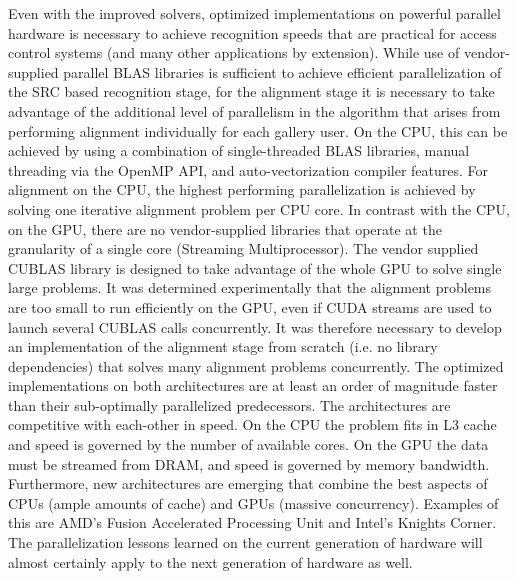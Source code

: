 Even with the improved solvers, optimized implementations on powerful parallel
hardware is necessary to achieve recognition speeds that are practical for
access control systems (and many other applications by extension).  While use
of vendor-supplied parallel BLAS libraries is sufficient to achieve efficient
parallelization of the SRC based recognition stage, for the alignment stage it
is necessary to take advantage of the additional level of parallelism in the
algorithm that arises from performing alignment individually for each gallery
user.  On the CPU, this can be achieved by using a combination of
single-threaded BLAS libraries, manual threading via the OpenMP API, and
auto-vectorization compiler features.  For alignment on the CPU, the highest
performing parallelization is achieved by solving one iterative alignment
problem per CPU core.  In contrast with the CPU, on the GPU, there are no
vendor-supplied libraries that operate at the granularity of a single core
(Streaming Multiprocessor).  The vendor supplied CUBLAS library is designed to
take advantage of the whole GPU to solve single large problems.  It was
determined experimentally that the alignment problems are too small to run
efficiently on the GPU, even if CUDA streams are used to launch several CUBLAS
calls concurrently.  It was therefore necessary to develop an implementation of
the alignment stage from scratch (i.e. no library dependencies) that solves
many alignment problems concurrently.  The optimized implementations on both
architectures are at least an order of magnitude faster than their
sub-optimally parallelized predecessors.  The architectures are competitive
with each-other in speed.  On the CPU the problem fits in L3 cache and speed is
governed by the number of available cores.  On the GPU the data must be
streamed from DRAM, and speed is governed by memory bandwidth.  Furthermore,
new architectures are emerging that combine the best aspects of CPUs (ample
amounts of cache) and GPUs (massive concurrency).  Examples of this are
AMD's Fusion Accelerated Processing Unit and Intel's Knights Corner.  The
parallelization lessons learned on the current generation of hardware will
almost certainly apply to the next generation of hardware as well.




